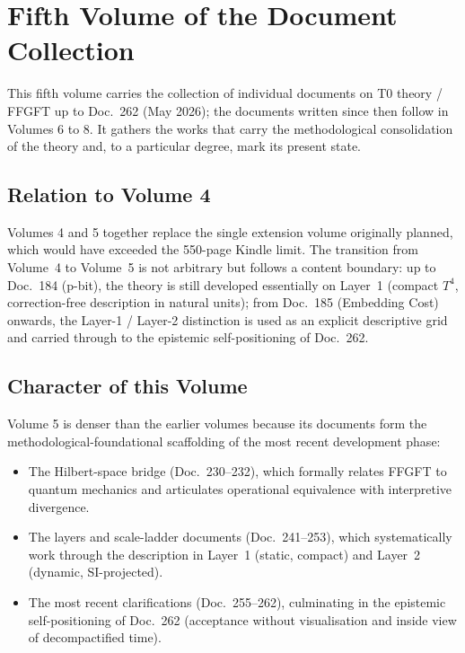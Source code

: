 
\section*{Fifth Volume of the Document Collection}

This fifth volume carries the collection of individual documents on T0
theory / FFGFT up to Doc.~262 (May 2026); the documents written since then
follow in Volumes 6 to 8. It gathers the works that carry the methodological
consolidation of the theory and, to a particular degree, mark its present
state.

\subsection*{Relation to Volume 4}

Volumes 4 and 5 together replace the single extension volume originally
planned, which would have exceeded the 550-page Kindle limit. The transition
from Volume~4 to Volume~5 is not arbitrary but follows a content boundary:
up to Doc.~184 (p-bit), the theory is still developed essentially on
Layer~1 (compact $T^4$, correction-free description in natural units); from
Doc.~185 (Embedding Cost) onwards, the Layer-1 / Layer-2 distinction is
used as an explicit descriptive grid and carried through to the epistemic
self-positioning of Doc.~262.

\subsection*{Character of this Volume}

Volume 5 is denser than the earlier volumes because its documents form the
methodological-foundational scaffolding of the most recent development phase:
\begin{itemize}
\item The Hilbert-space bridge (Doc.~230--232), which formally relates FFGFT
      to quantum mechanics and articulates operational equivalence with
      interpretive divergence.
\item The layers and scale-ladder documents (Doc.~241--253), which
      systematically work through the description in Layer~1 (static,
      compact) and Layer~2 (dynamic, SI-projected).
\item The most recent clarifications (Doc.~255--262), culminating in the
      epistemic self-positioning of Doc.~262 (acceptance without
      visualisation and inside view of decompactified time).
\end{itemize}

